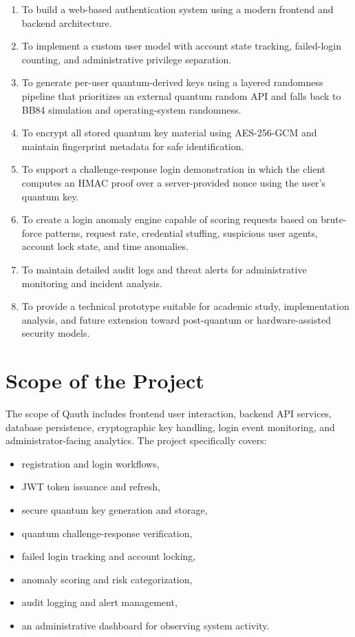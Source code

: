\begin{enumerate}
    \item To build a web-based authentication system using a modern frontend and backend architecture.
    \item To implement a custom user model with account state tracking, failed-login counting, and administrative privilege separation.
    \item To generate per-user quantum-derived keys using a layered randomness pipeline that prioritizes an external quantum random API and falls back to BB84 simulation and operating-system randomness.
    \item To encrypt all stored quantum key material using AES-256-GCM and maintain fingerprint metadata for safe identification.
    \item To support a challenge-response login demonstration in which the client computes an HMAC proof over a server-provided nonce using the user's quantum key.
    \item To create a login anomaly engine capable of scoring requests based on brute-force patterns, request rate, credential stuffing, suspicious user agents, account lock state, and time anomalies.
    \item To maintain detailed audit logs and threat alerts for administrative monitoring and incident analysis.
    \item To provide a technical prototype suitable for academic study, implementation analysis, and future extension toward post-quantum or hardware-assisted security models.
\end{enumerate}

\section{Scope of the Project}
The scope of Qauth includes frontend user interaction, backend API services, database persistence, cryptographic key handling, login event monitoring, and administrator-facing analytics. The project specifically covers:

\begin{itemize}
    \item registration and login workflows,
    \item JWT token issuance and refresh,
    \item secure quantum key generation and storage,
    \item quantum challenge-response verification,
    \item failed login tracking and account locking,
    \item anomaly scoring and risk categorization,
    \item audit logging and alert management,
    \item an administrative dashboard for observing system activity.
\end{itemize}

